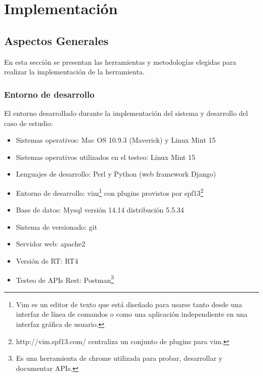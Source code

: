\chapter{Implementación}
\label{capitulo4}
\section{Aspectos Generales}
En esta sección se presentan las herramientas y metodologías elegidas para realizar la implementación de la herramienta.

\subsection{Entorno de desarrollo}
El entorno desarrollado durante la implementación del sistema y desarrollo del caso de estudio:

\begin{itemize}
	\item Sistemas operativos: Mac OS 10.9.3 (Maverick) y Linux Mint 15
	\item Sistemas operativos utilizados en el testeo: Linux Mint 15
	\item Lenguajes de desarrollo: Perl y Python (web framework Django)
	\item Entorno de desarrollo: vim\footnote{Vim es un editor de texto que está diseñado para usarse tanto desde una interfaz de línea de comandos o como una aplicación independiente en una interfaz gráfica de usuario.}  con plugins provistos por spf13\footnote{http://vim.spf13.com/ centraliza un conjunto de plugins para vim.}
	\item Base de datos: Mysql versión 14.14 distribución 5.5.34
	\item Sistema de versionado: git
	\item Servidor web: apache2
	\item Versión de RT: RT4
	\item Testeo de APIs Rest: Postman\footnote{Es una herramienta de chrome utilizada para probar, desarrollar y documentar APIs.}
	
\end{itemize}

